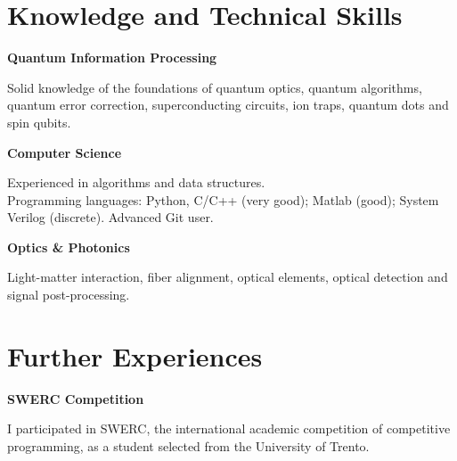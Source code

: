 \documentclass[a4paper,10pt]{article}
\begin{document}
\begin{adjustbox}{valign=t}
\begin{minipage}{0.6\textwidth}
\section*{Knowledge and Technical Skills}
\begin{description}
\setlength\itemsep{-2em}

\item \textbf{Quantum Information Processing}
\begin{spacing}{1.2}
	\small Solid knowledge of the foundations of quantum optics, quantum algorithms, quantum error correction, superconducting circuits, ion traps, quantum dots and spin qubits.
\end{spacing}
\item \textbf{Computer Science}
\begin{spacing}{1.2}
	\small
	Experienced in algorithms and data structures.\\
	Programming languages: Python, C/C++ (very good); Matlab (good); System Verilog (discrete). Advanced Git user.
\end{spacing}

\item \textbf{Optics \& Photonics}
\begin{spacing}{1.2}
	\small Light-matter interaction, fiber alignment, optical elements, optical detection and signal post-processing.\normalsize
\end{spacing}
	
\end{description}
\vspace{-1cm}
\section*{Further Experiences}
\begin{description}
\raggedright
\item[\normalfont \textcolor{ColorTwo}{March 2021}] 
	\textbf{SWERC Competition}\\
	\begin{spacing}{1.4}
		\small
		I participated in SWERC, the international academic competition of competitive programming, as a student selected from the University of Trento.		
	\end{spacing}
	
\end{description}

\MySkip
\end{minipage}
\end{adjustbox}
\end{document}
